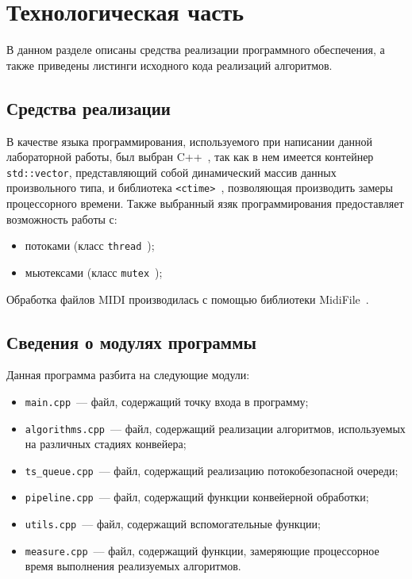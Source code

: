 \chapter{Технологическая часть}

В данном разделе описаны средства реализации программного обеспечения, а также приведены листинги исходного кода реализаций алгоритмов.

\section{Средства реализации}

В качестве языка программирования, используемого при написании данной лабораторной работы, был выбран C++~\cite{cpp-lang}, так как в нем имеется контейнер \texttt{std::vector}, представляющий собой динамический массив данных произвольного типа, и библиотека \texttt{<ctime>}~\cite{cpp-ctime}, позволяющая производить замеры процессорного времени.
Также выбранный язяк программирования предоставляет возможность работы с:
\begin{itemize}
	\item потоками (класс \texttt{thread}~\cite{cpp-thread});
	\item мьютексами (класс \texttt{mutex}~\cite{cpp-mutex});
\end{itemize}

Обработка файлов MIDI производилась с помощью библиотеки MidiFile~\cite{midifile}.

\section{Сведения о модулях программы}

Данная программа разбита на следующие модули:
\begin{itemize}
	\item \texttt{main.cpp}~--- файл, содержащий точку входа в программу;
	\item \texttt{algorithms.cpp}~--- файл, содержащий реализации алгоритмов, используемых на различных стадиях конвейера;
	\item \texttt{ts\_queue.cpp}~--- файл, содержащий реализацию потокобезопасной очереди;
	\item \texttt{pipeline.cpp}~--- файл, содержащий функции конвейерной обработки;
	\item \texttt{utils.cpp}~--- файл, содержащий вспомогательные функции;
	\item \texttt{measure.cpp}~--- файл, содержащий функции, замеряющие процессорное время выполнения реализуемых алгоритмов.
\end{itemize}

